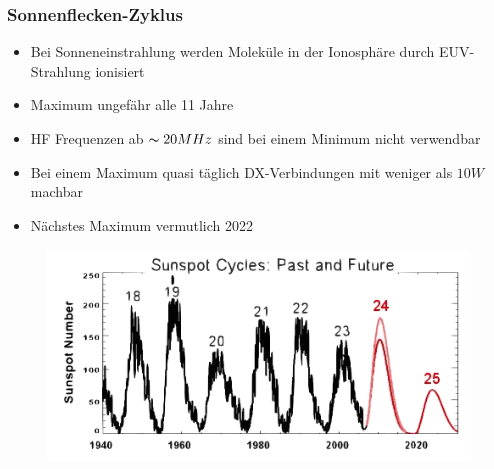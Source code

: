 \begin{frame}
  \frametitle{Sonnenflecken-Zyklus}
  \begin{itemize}
    \item Bei Sonneneinstrahlung werden Moleküle in der Ionosphäre durch EUV-Strahlung ionisiert
    \item Maximum ungefähr alle 11 Jahre
    \item HF Frequenzen ab $\thicksim20MHz$ sind bei einem Minimum nicht verwendbar
    \item Bei einem Maximum quasi täglich DX-Verbindungen mit weniger als $10W$ machbar
    \item Nächstes Maximum vermutlich 2022
  \end{itemize}
  \begin{center}
    \begin{figure}
      \includegraphics[width=.8\textwidth,height=.3\textheight,keepaspectratio]{e09/Predictions_sunspot.png}
    \end{figure}
  \end{center}
\end{frame}

